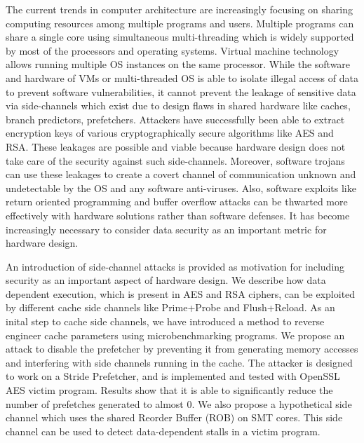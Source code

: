 \begin{Abstract}
The current trends in computer architecture are increasingly focusing on
sharing computing resources among multiple programs and users.
Multiple programs can share a single core using simultaneous multi-threading
which is widely supported by most of the processors and operating systems.
Virtual machine technology allows running multiple OS instances on the same
processor. While the software and hardware of VMs or multi-threaded OS
is able to isolate illegal access of data to prevent software vulnerabilities, 
it cannot prevent the leakage of sensitive data via side-channels
which exist due to design flaws in shared hardware like caches, branch predictors,
prefetchers.
Attackers have successfully been able to extract encryption keys of
various cryptographically secure algorithms like AES and RSA.
These leakages are possible and viable because hardware design
does not take care of the security against such side-channels.
Moreover, software trojans can use these leakages to create a
covert channel of communication unknown and undetectable by the OS
and any software anti-viruses.
Also, software exploits like return oriented programming
and buffer overflow attacks can be thwarted more effectively
with hardware solutions rather than software defenses.
It has become increasingly necessary to consider data security as
an important metric for hardware design.

An introduction of side-channel attacks is provided as motivation
for including security as an important aspect of hardware design.
We describe how data dependent execution, which is present in AES and RSA ciphers,
can be exploited by different cache side channels like Prime+Probe and Flush+Reload.
As an inital step to cache side channels, we have introduced a method to reverse engineer
cache parameters using microbenchmarking programs.
We propose an attack to disable the prefetcher by preventing
it from generating memory accesses and interfering with side channels
running in the cache.
The attacker is designed to work on a Stride Prefetcher, and is implemented and
tested with OpenSSL AES victim program.
Results show that it is able to significantly reduce the number of prefetches
generated to almost 0.
We also propose a hypothetical side channel which uses the shared Reorder Buffer (ROB) on
SMT cores. This side channel can be used to detect data-dependent stalls in a victim program.
%
%
%
%
%
\end{Abstract}

